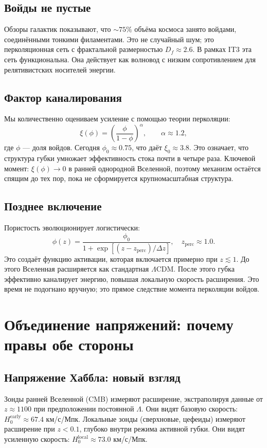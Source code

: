 \documentclass[12pt,a4paper]{report}
\begin{document}
\section{Войды не пустые}
Обзоры галактик показывают, что $\sim 75\%$ объёма космоса занято войдами, соединёнными тонкими филаментами. Это не случайный шум; это перколяционная сеть с фрактальной размерностью $D_f \approx 2.6$. В рамках IT3 эта сеть функциональна. Она действует как волновод с низким сопротивлением для релятивистских носителей энергии.

\section{Фактор каналирования}
Мы количественно оцениваем усиление с помощью теории перколяции:
$$
\xi(\phi) = \left(\frac{\phi}{1-\phi}\right)^\alpha, \qquad \alpha \approx 1.2,
$$
где $\phi$ — доля войдов. Сегодня $\phi_0 \approx 0.75$, что даёт $\xi_0 \approx 3.8$. Это означает, что структура губки умножает эффективность стока почти в четыре раза. Ключевой момент: $\xi(\phi) \to 0$ в ранней однородной Вселенной, поэтому механизм остаётся спящим до тех пор, пока не сформируется крупномасштабная структура.

\section{Позднее включение}
Пористость эволюционирует логистически:
$$
\phi(z) = \frac{\phi_0}{1 + \exp[(z - z_{\mathrm{perc}})/\Delta z]}, \quad z_{\mathrm{perc}} \approx 1.0.
$$
Это создаёт функцию активации, которая включается примерно при $z \lesssim 1$. До этого Вселенная расширяется как стандартная $\Lambda$CDM. После этого губка эффективно каналирует энергию, повышая локальную скорость расширения. Это время не подогнано вручную; это прямое следствие момента перколяции войдов.

\chapter{Объединение напряжений: почему правы обе стороны}
\section{Напряжение Хаббла: новый взгляд}
Зонды ранней Вселенной (CMB) измеряют расширение, экстраполируя данные от $z \approx 1100$ при предположении постоянной $\Lambda$. Они видят базовую скорость: $H_0^{\mathrm{early}} \approx 67.4$ км/с/Мпк. Локальные зонды (сверхновые, цефеиды) измеряют расширение при $z < 0.1$, глубоко внутри режима активной губки. Они видят усиленную скорость: $H_0^{\mathrm{local}} \approx 73.0$ км/с/Мпк.
\end{document}
